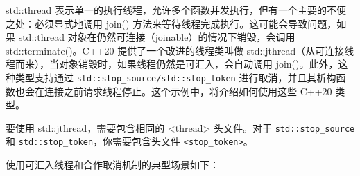 std::thread 表示单一的执行线程，允许多个函数并发执行，但有一个主要的不便之处：必须显式地调用 join() 方法来等待线程完成执行。这可能会导致问题，如果 std::thread 对象在仍然可连接（joinable）的情况下销毁，会调用 std::terminate()。C++20 提供了一个改进的线程类叫做 std::jthread（从可连接线程而来），当对象销毁时，如果线程仍然是可汇入，会自动调用 join()。此外，这种类型支持通过 \verb|std::stop_source/std::stop_token| 进行取消，并且其析构函数也会在连接之前请求线程停止。这个示例中，将介绍如何使用这些 C++20 类型。


要使用 std::jthread，需要包含相同的 <thread> 头文件。对于 \verb|std::stop_source| 和 \verb|std::stop_token|，你需要包含头文件 \verb|<stop_token>|。


使用可汇入线程和合作取消机制的典型场景如下：


